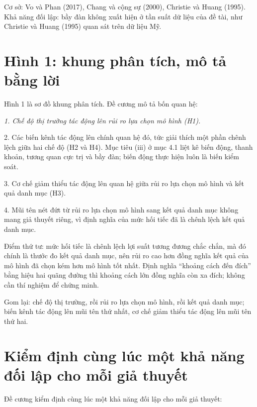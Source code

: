 Cơ sở: Vo và Phan (2017), Chang và cộng sự (2000), Christie và Huang (1995). Khả năng đối lập: bầy đàn không xuất hiện ở tần suất dữ liệu của đề tài, như Christie và Huang (1995) quan sát trên dữ liệu Mỹ.

\section{Hình 1: khung phân tích, mô tả bằng lời}

Hình 1 là sơ đồ khung phân tích. Đề cương mô tả bốn quan hệ:

{\itshape 1. Chế độ thị trường tác động lên rủi ro lựa chọn mô hình (H1).

2. Các biến kênh tác động lên chính quan hệ đó, tức giải thích một phần chênh lệch giữa hai chế độ (H2 và H4). Mục tiêu (iii) ở mục 4.1 liệt kê biến động, thanh khoản, tương quan cực trị và bầy đàn; biến động thực hiện luôn là biến kiểm soát.

3. Cơ chế giảm thiểu tác động lên quan hệ giữa rủi ro lựa chọn mô hình và kết quả danh mục (H3).

4. Mũi tên nét đứt từ rủi ro lựa chọn mô hình sang kết quả danh mục không mang giả thuyết riêng, vì định nghĩa của mức hối tiếc đã là chênh lệch kết quả danh mục.\par}

Điểm thứ tư: mức hối tiếc là chênh lệch lợi suất tương đương chắc chắn, mà đó chính là thước đo kết quả danh mục, nên rủi ro cao hơn đồng nghĩa kết quả của mô hình đã chọn kém hơn mô hình tốt nhất. Định nghĩa “khoảng cách đến đích” bằng hiệu hai quãng đường thì khoảng cách lớn đồng nghĩa còn xa đích; không cần thí nghiệm để chứng minh.

Gom lại: chế độ thị trường, rồi rủi ro lựa chọn mô hình, rồi kết quả danh mục; biến kênh tác động lên mũi tên thứ nhất, cơ chế giảm thiểu tác động lên mũi tên thứ hai.

\section{Kiểm định cùng lúc một khả năng đối lập cho mỗi giả thuyết}

Đề cương kiểm định cùng lúc một khả năng đối lập cho mỗi giả thuyết:

